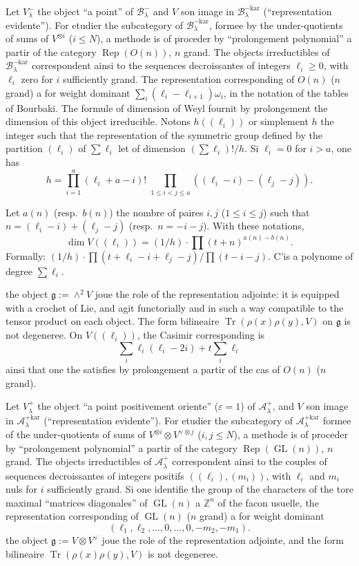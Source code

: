 \documentclass[11pt,a4paper]{article}
\DeclareMathOperator{\Tr}{Tr}
\DeclareMathOperator{\Rep}{Rep}
\DeclareMathOperator{\GL}{GL}
\newcommand{\frg}{\mathfrak{g}}
\newcommand{\Z}{\mathbb{Z}}
\begin{document}
Let $V_\lambda^-$ the object ``a point'' of $\mathcal{B}_\lambda^-$ and $V$ son image in $\mathcal{B}_\lambda^{-\text{kar}}$ (``representation evidente''). For etudier the subcategory of $\mathcal{B}_\lambda^{-\text{kar}}$, formee by the under-quotients of sums of $V^{\otimes i}$ ($i \leq N$), a methode is of proceder by ``prolongement polynomial'' a partir of the category $\Rep(O(n))$, $n$ grand. The objects irreductibles of $\mathcal{B}_\lambda^{-\text{kar}}$ correspondent ainsi to the sequences decroissantes of integers $\ell_i \geq 0$, with $\ell_i$ zero for $i$ sufficiently grand. The representation corresponding of $O(n)$ ($n$ grand) a for weight dominant $\sum_i (\ell_i - \ell_{i+1})\omega_i$, in the notation of the tables of Bourbaki. The formule of dimension of Weyl fournit by prolongement the dimension of this object irreducible. Notons $h((\ell_i))$ or simplement $h$ the integer such that the representation of the symmetric group defined by the partition $(\ell_i)$ of $\sum \ell_i$ let of dimension $(\sum \ell_i)!/h$. Si $\ell_i = 0$ for $i > a$, one has
$$
h = \prod_{i=1}^a (\ell_i + a - i)! \; \prod_{1 \leq i < j \leq a} ((\ell_i - i) - (\ell_j - j)).
$$

Let $a(n)$ (resp.~$b(n)$) the nombre of paires $i, j$ ($1 \leq i \leq j$) such that $n = (\ell_i - i) + (\ell_j - j)$ (resp.~$n = -i - j$). With these notations,
$$
\dim V((\ell_i)) = (1/h) \cdot \prod (t + n)^{a(n) - b(n)}.
$$
Formally: $(1/h) \cdot \prod (t + \ell_i - i + \ell_j - j) / \prod (t - i - j)$. C'is a polynome of degree $\sum \ell_i$.

the object $\frg := \wedge^2 V$ joue the role of the representation adjointe: it is equipped with a crochet of Lie, and agit functorially and in such a way compatible to the tensor product on each object. The form bilineaire $\Tr(\rho(x)\rho(y), V)$ on $\frg$ is not degeneree. On $V((\ell_i))$, the Casimir corresponding is
$$
\sum_i \ell_i(\ell_i - 2i) + t \sum_i \ell_i
$$
ainsi that one the satisfies by prolongement a partir of the cas of $O(n)$ ($n$ grand).

Let $V_\lambda^+$ the object ``a point positivement oriente'' ($\varepsilon = 1$) of $\mathcal{A}_\lambda^+$, and $V$ son image in $\mathcal{A}_\lambda^{+\text{kar}}$ (``representation evidente''). For etudier the subcategory of $\mathcal{A}_\lambda^{+\text{kar}}$ formee of the under-quotients of sums of $V^{\otimes i} \otimes V^{\vee \otimes j}$ ($i, j \leq N$), a methode is of proceder by ``prolongement polynomial'' a partir of the category $\Rep(\GL(n))$, $n$ grand. The objects irreductibles of $\mathcal{A}_\lambda^{+}$ correspondent ainsi to the couples of sequences decroissantes of integers positifs $((\ell_i), (m_i))$, with $\ell_i$ and $m_i$ nuls for $i$ sufficiently grand. Si one identifie the group of the characters of the tore maximal ``matrices diagonales'' of $\GL(n)$ a $\Z^n$ of the facon usuelle, the representation corresponding of $\GL(n)$ ($n$ grand) a for weight dominant
$$
(\ell_1, \ell_2, \ldots, 0, \ldots, 0, -m_2, -m_1).
$$
the object $\frg := V \otimes V^\vee$ joue the role of the representation adjointe, and the form bilineaire $\Tr(\rho(x)\rho(y), V)$ is not degeneree.
\end{document}
